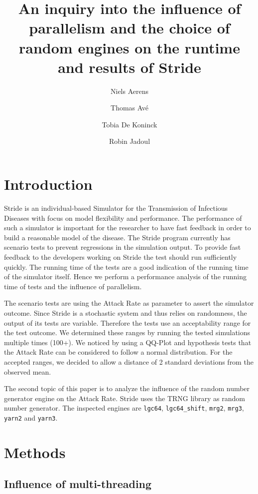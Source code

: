 \documentclass[natbib=true]{acmart}
\title{An inquiry into the influence of parallelism and the choice of random
engines on the runtime and results of Stride}
\author{Niels Aerens}
\author{Thomas Avé}
\author{Tobia De Koninck}
\author{Robin Jadoul}
\begin{document}
\maketitle

\section{Introduction}
Stride \cite{KUYLEN20172438} is an individual-based Simulator for the Transmission of Infectious Diseases with focus on model flexibility and
performance. The performance of such a simulator is important for the researcher to have fast feedback in order to
build a reasonable model of the disease. The Stride program currently has scenario tests to prevent regressions in the
simulation output. To provide fast feedback to the developers working on Stride the test should run sufficiently quickly.
The running time of the tests are a good indication of the running time of the simulator itself. Hence we perform a
performance analysis of the running time of tests and the influence of parallelism.

The scenario tests are using the Attack Rate as parameter to assert the simulator outcome. Since Stride is a stochastic
system and thus relies on randomness, the output of its tests are variable. Therefore the tests use an acceptability range
for the test outcome. We determined these ranges by running the tested simulations multiple times (100+). We noticed
by using a QQ-Plot and hypothesis tests that the Attack Rate can be considered to follow a normal distribution.
For the accepted ranges, we decided to allow a distance of 2 standard deviations from the observed mean.

The second topic of this paper is to analyze the influence of the random number generator engine on the Attack Rate.
Stride uses the TRNG library \citep{bauke2015tina} as random number generator. The inspected engines are \texttt{lgc64}, \texttt{lgc64\_shift}, \texttt{mrg2}, \texttt{mrg3}, \texttt{yarn2} and \texttt{yarn3}.

\pagebreak

\section{Methods}

\subsection{Influence of multi-threading}
\end{document}
